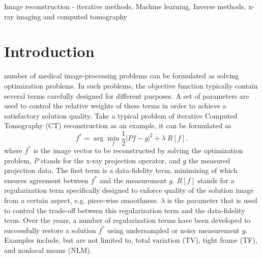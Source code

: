 \documentclass[journal]{IEEEtran}
\begin{document}
\begin{IEEEkeywords}
Image reconstruction - iterative methods, Machine learning, Inverse methods, x-ray imaging and computed tomography
\end{IEEEkeywords}


\ifCLASSOPTIONpeerreview
\fi
\IEEEpeerreviewmaketitle



\section{Introduction}

 number of medical image-processing problems can be formulated as solving optimization problems. In such problems, the objective function typically contain several terms carefully designed for different purposes. A set of parameters are used to control the relative weights of these terms in order to achieve a satisfactory solution quality. Take a typical problem of iterative Computed Tomography (CT) reconstruction as an example, it can be formulated as 
\begin{equation}
\label{Eq:CTreconGeneral}
f^* = \arg\min_f\frac{1}{2}|Pf-g|^2+\lambda~R[f],
\end{equation}
where $f^*$ is the image vector to be reconstructed by solving the optimization problem, $P$ stands for the x-ray projection operator, and $g$ the measured projection data. The first term is a data-fidelity term, minimizing of which ensures agreement between $f^*$ and the measurement $g$. $R[f]$ stands for a regularization term specifically designed to enforce quality of the solution image from a certain aspect, e.g. piece-wise smoothness. $\lambda$ is the parameter that is used to control the trade-off between this regularization term and the data-fidelity term. Over the years, a number of regularization terms have been developed to successfully restore a solution $f^*$ using undersampled or noisy measurement $g$. Examples include, but are not limited to, total variation (TV)\cite{Rudin:PhyD:1992,Sidky:PMB:2008,Jia:MP:2010}, tight frame (TF)\cite{Dong:IAS:2010,Jia:PMB:2011}, and nonlocal means (NLM)\cite{Lou:JSC:2010,Chen:PhyMed:2016,Jia:MP:2012}.
\end{document}

